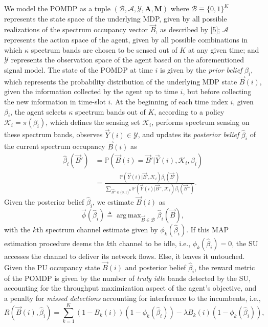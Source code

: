 \documentclass[10pt,twocolumn]{IEEEtran}
\DeclareMathOperator*{\argmax}{arg\,max}
\begin{document}
We model the POMDP as a tuple $(\mathcal B,\mathcal{A},\mathcal{Y},\mathbf{A},\mathbf{M})$ where $\mathcal{B}{\equiv}\{0,1\}^K$ represents the state space of the underlying MDP, given by all possible realizations of the spectrum occupancy vector $\vec{B}$, as described by \eqref{5}; $\mathcal{A}$ represents the action space of the agent, given by all possible combinations in which $\kappa$ spectrum bands are chosen to be sensed out of $K$ at any given time; and $\mathcal{Y}$ represents the observation space of the agent based on the aforementioned signal model. The state of the POMDP at time $i$ is given by the \emph{prior belief} $\beta_i$, which represents the probability distribution of the underlying MDP state $\vec{B}(i)$, given the information collected by the agent up to time $i$, but before collecting the new information in time-slot $i$. At the beginning of each time index $i$, given $\beta_i$, the agent selects $\kappa$ spectrum bands out of $K$, according to a policy $\mathcal K_i{=}\pi(\beta_i)$, which defines the sensing set $\mathcal K_i$, performs spectrum sensing  on these spectrum bands, observes $\vec{Y}(i){\in} \mathcal{Y}$, and updates its \emph{posterior belief} $\hat{\beta}_i$ of the current spectrum occupancy $\vec{B}(i)$ as 
\begin{align}\label{11}
\nonumber
\hat\beta_i(\vec{B}') &= \mathbb{P}(\vec{B}(i) = \vec{B}'|\vec{Y}(i), \mathcal K_i, \beta_i)\\&=
\frac{\mathbb{P}(\vec{Y}(i)|\vec{B}', \mathcal{K}_i) \beta_i(\vec{B}')}{
\sum_{\vec{B}'' {\in} \{0,1\}^K} \mathbb{P}(\vec{Y}(i)|\vec{B}'', \mathcal{K}_i) \beta_i(\vec{B}'')}.
\end{align}
Given the posterior belief $\hat{\beta}_i$, we estimate $\vec{B}(i)$ as 
$$
\vec{\phi}(\hat{\beta}_{i})\triangleq \argmax_{\vec{B} {\in} \mathcal{B}} \hat{\beta}_{i}(\vec{B}),
$$
with the $k$th spectrum channel estimate given by $\phi_k(\hat{\beta}_{i})$. If this MAP estimation procedure deems the $k$th channel to be idle, i.e., $\phi_{k}(\hat{\beta}_{i}){=}0$, the SU accesses the channel to deliver its network flows. Else, it leaves it untouched. Given the PU occupancy state $\vec{B}(i)$ and posterior belief $\hat\beta_i$, the reward metric of the POMDP is given by the number of \emph{truly idle} bands detected by the SU, accounting for the throughput maximization aspect of the agent's objective, and a penalty for \emph{missed detections} accounting for interference to the incumbents, i.e.,
\begin{equation}
\nonumber
    R(\vec{B}(i), \hat{\beta}_i){=}\sum_{k=1}^{K} (1{-}B_k(i))(1{-}\phi_k(\hat{\beta}_{i})){-}\lambda B_k(i)(1 - \phi_k(\hat{\beta}_i)),
\end{equation}
\end{document}
